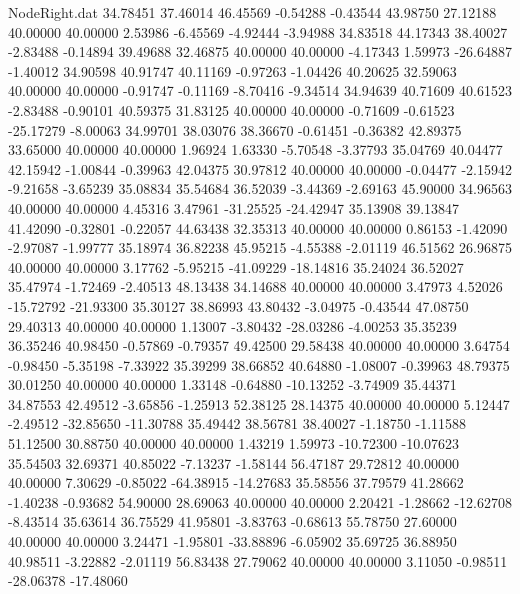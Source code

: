 \begin{filecontents}{NodeRight.dat}
  34.78451   37.46014   46.45569    -0.54288   -0.43544   43.98750   27.12188   40.00000   40.00000    2.53986   -6.45569   -4.92444   -3.94988
  34.83518   44.17343   38.40027    -2.83488   -0.14894   39.49688   32.46875   40.00000   40.00000   -4.17343    1.59973  -26.64887   -1.40012
  34.90598   40.91747   40.11169    -0.97263   -1.04426   40.20625   32.59063   40.00000   40.00000   -0.91747   -0.11169   -8.70416   -9.34514
  34.94639   40.71609   40.61523    -2.83488   -0.90101   40.59375   31.83125   40.00000   40.00000   -0.71609   -0.61523  -25.17279   -8.00063
  34.99701   38.03076   38.36670    -0.61451   -0.36382   42.89375   33.65000   40.00000   40.00000    1.96924    1.63330   -5.70548   -3.37793
  35.04769   40.04477   42.15942    -1.00844   -0.39963   42.04375   30.97812   40.00000   40.00000   -0.04477   -2.15942   -9.21658   -3.65239
  35.08834   35.54684   36.52039    -3.44369   -2.69163   45.90000   34.96563   40.00000   40.00000    4.45316    3.47961  -31.25525  -24.42947
  35.13908   39.13847   41.42090    -0.32801   -0.22057   44.63438   32.35313   40.00000   40.00000    0.86153   -1.42090   -2.97087   -1.99777
  35.18974   36.82238   45.95215    -4.55388   -2.01119   46.51562   26.96875   40.00000   40.00000    3.17762   -5.95215  -41.09229  -18.14816
  35.24024   36.52027   35.47974    -1.72469   -2.40513   48.13438   34.14688   40.00000   40.00000    3.47973    4.52026  -15.72792  -21.93300
  35.30127   38.86993   43.80432    -3.04975   -0.43544   47.08750   29.40313   40.00000   40.00000    1.13007   -3.80432  -28.03286   -4.00253
  35.35239   36.35246   40.98450    -0.57869   -0.79357   49.42500   29.58438   40.00000   40.00000    3.64754   -0.98450   -5.35198   -7.33922
  35.39299   38.66852   40.64880    -1.08007   -0.39963   48.79375   30.01250   40.00000   40.00000    1.33148   -0.64880  -10.13252   -3.74909
  35.44371   34.87553   42.49512    -3.65856   -1.25913   52.38125   28.14375   40.00000   40.00000    5.12447   -2.49512  -32.85650  -11.30788
  35.49442   38.56781   38.40027    -1.18750   -1.11588   51.12500   30.88750   40.00000   40.00000    1.43219    1.59973  -10.72300  -10.07623
  35.54503   32.69371   40.85022    -7.13237   -1.58144   56.47187   29.72812   40.00000   40.00000    7.30629   -0.85022  -64.38915  -14.27683
  35.58556   37.79579   41.28662    -1.40238   -0.93682   54.90000   28.69063   40.00000   40.00000    2.20421   -1.28662  -12.62708   -8.43514
  35.63614   36.75529   41.95801    -3.83763   -0.68613   55.78750   27.60000   40.00000   40.00000    3.24471   -1.95801  -33.88896   -6.05902
  35.69725   36.88950   40.98511    -3.22882   -2.01119   56.83438   27.79062   40.00000   40.00000    3.11050   -0.98511  -28.06378  -17.48060

\end{filecontents}
